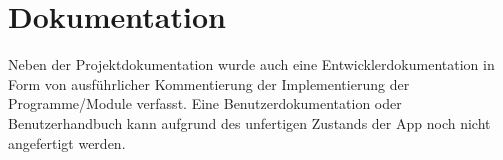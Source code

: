 \section{Dokumentation}
\label{sec:Dokumentation}

Neben der Projektdokumentation wurde auch eine Entwicklerdokumentation in Form von ausführlicher Kommentierung der Implementierung der Programme/Module verfasst. Eine Benutzerdokumentation oder Benutzerhandbuch kann aufgrund des unfertigen Zustands der App noch nicht angefertigt werden.
